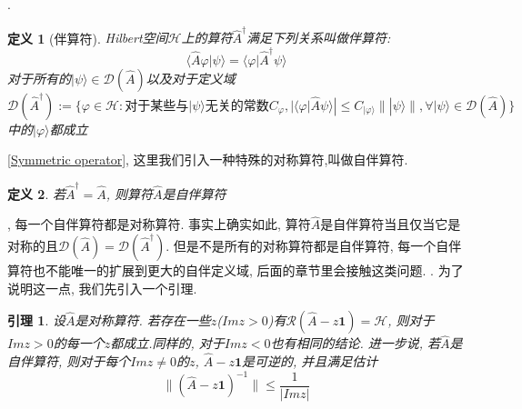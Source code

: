 \documentclass[a4paper,11pt]{book}
\newtheorem{definition}{\hspace{2em}定义}[section]
\newtheorem{lemma}{\hspace{2em}引理}[section]
\begin{document}
.
\begin{definition}[伴算符]\label{Self-adjoint def 2}
  Hilbert空间$\mathcal{H}$上的算符$\hat{A}^{\dag}$满足下列关系叫做伴算符:
\begin{equation}\label{Adjoint operator}
  \langle\hat{A}\varphi|\psi\rangle=\langle\varphi|\hat{A}^{\dag}\psi\rangle
\end{equation}
对于所有的$|\psi\rangle\in\mathcal{D}(\hat{A})$以及对于定义域
\begin{equation*}
  \mathcal{D}(\hat{A}^{\dag}):=\{\varphi\in\mathcal{H}:\text{对于某些与$|\psi\rangle$无关的常数}C_{\varphi}, |\langle\varphi|\hat{A}\psi\rangle|\leq C_{|\varphi\rangle}\||\psi\rangle\|,\forall|\psi\rangle\in\mathcal{D}(\hat{A})\}
\end{equation*}
中的$|\varphi\rangle$都成立
\end{definition}
\ref{Symmetric operator}, 这里我们引入一种特殊的对称算符,叫做自伴算符.
\begin{definition}
  若$\hat{A}^{\dag}=\hat{A}$, 则算符$\hat{A}$是自伴算符
\end{definition}
, 每一个自伴算符都是对称算符. 事实上确实如此, 算符$\hat{A}$是自伴算符当且仅当它是对称的且$\mathcal{D}(\hat{A})=\mathcal{D}(\hat{A}^{\dag})$. 但是不是所有的对称算符都是自伴算符, 每一个自伴算符也不能唯一的扩展到更大的自伴定义域, 后面的章节里会接触这类问题.
. 为了说明这一点, 我们先引入一个引理.
\begin{lemma}\label{sym operator lemma}
  设$\hat{A}$是对称算符. 若存在一些$z$($Im z>0$)有$\mathcal{R}(\hat{A}-z\mathbf{1})=\mathcal{H}$, 则对于$Im z>0$的每一个$z$都成立.同样的, 对于$Im z<0$也有相同的结论. 进一步说, 若$\hat{A}$是自伴算符, 则对于每个$Im z\neq0$的$z$, $\hat{A}-z\mathbf{1}$是可逆的, 并且满足估计
\begin{equation}\label{sym estimate}
  \|(\hat{A}-z\mathbf{1})^{-1}\|\leq\frac{1}{|Im z|}
\end{equation}
\end{lemma}
\end{document}
